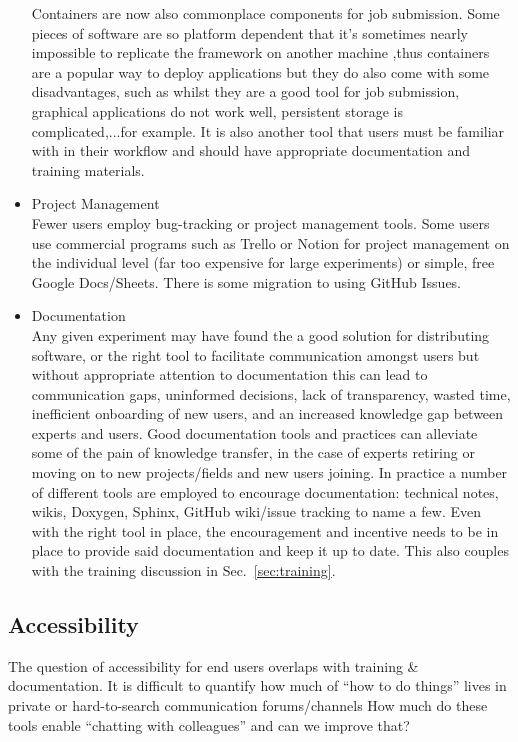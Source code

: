 \begin{itemize}
Containers are now also commonplace components for job submission. Some pieces of software are so platform dependent that it's sometimes nearly impossible to replicate the framework on another machine ,thus containers are a popular way to deploy applications but they do also come with some disadvantages, such as whilst they are a good tool for job submission, graphical applications do not work well, persistent storage is complicated,...for example. It is also another tool that users must be familiar with in their workflow and should have appropriate documentation and training materials.
  \item Project Management\\
Fewer users employ bug-tracking or project management tools. Some users use commercial programs such as Trello or Notion for project management on the individual level (far too expensive for large experiments) or simple, free Google Docs/Sheets. There is some migration to using GitHub Issues.
  \item Documentation\\
Any given experiment may have found the a good solution for distributing software, or the right tool to facilitate communication amongst users but without appropriate attention to documentation this can lead to communication gaps, uninformed decisions, lack of transparency, wasted time, inefficient onboarding of new users, and an increased knowledge gap between experts and users.  Good documentation tools and practices can alleviate some of the pain of knowledge transfer, in the case of experts retiring or moving on to new projects/fields and new users joining. In practice a number of different tools are employed to encourage documentation: technical notes, wikis, Doxygen, Sphinx, GitHub wiki/issue tracking to name a few. Even with the right tool in place, the encouragement and incentive needs to be in place to provide said documentation and keep it up to date. This also couples with the training discussion in Sec.~\ref{sec:training}.

\end{itemize}

\subsection{Accessibility}
The question of accessibility for end users overlaps with training \& documentation. It is difficult to quantify how much of “how to do things” lives in private or hard-to-search communication forums/channels
How much do these tools enable “chatting with colleagues” and can we improve that?



